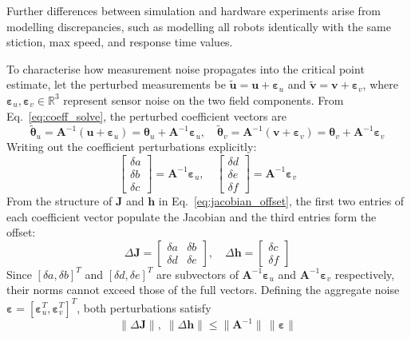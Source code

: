 \documentclass[lettersize,journal]{IEEEtran}
\begin{document}
Further differences between simulation and hardware experiments arise from modelling discrepancies, such as modelling all robots identically with the same stiction, max speed, and response time values. 

To characterise how measurement noise propagates into the critical point estimate, let the perturbed measurements be $\tilde{\mathbf{u}} = \mathbf{u} + \boldsymbol{\varepsilon}_u$ and $\tilde{\mathbf{v}} = \mathbf{v} + \boldsymbol{\varepsilon}_v$, where $\boldsymbol{\varepsilon}_u, \boldsymbol{\varepsilon}_v \in \mathbb{R}^3$ represent sensor noise on the two field components. From Eq.~\eqref{eq:coeff_solve}, the perturbed coefficient vectors are
\begin{equation}
    \tilde{\boldsymbol{\theta}}_u = \mathbf{A}^{-1}(\mathbf{u} + \boldsymbol{\varepsilon}_u) = \boldsymbol{\theta}_u + \mathbf{A}^{-1}\boldsymbol{\varepsilon}_u, \quad \tilde{\boldsymbol{\theta}}_v = \mathbf{A}^{-1}(\mathbf{v} + \boldsymbol{\varepsilon}_v) = \boldsymbol{\theta}_v + \mathbf{A}^{-1}\boldsymbol{\varepsilon}_v
    \label{eq:perturbed_coeffs}
\end{equation}
Writing out the coefficient perturbations explicitly:
\begin{equation}
    \begin{bmatrix} \delta a \\ \delta b \\ \delta c \end{bmatrix} = \mathbf{A}^{-1}\boldsymbol{\varepsilon}_u, \quad
    \begin{bmatrix} \delta d \\ \delta e \\ \delta f \end{bmatrix} = \mathbf{A}^{-1}\boldsymbol{\varepsilon}_v
    \label{eq:coeff_perturbations}
\end{equation}
From the structure of $\mathbf{J}$ and $\mathbf{h}$ in Eq.~\eqref{eq:jacobian_offset}, the first two entries of each coefficient vector populate the Jacobian and the third entries form the offset:
\begin{equation}
    \Delta\mathbf{J} = \begin{bmatrix} \delta a & \delta b \\ \delta d & \delta e \end{bmatrix}, \quad
    \Delta\mathbf{h} = \begin{bmatrix} \delta c \\ \delta f \end{bmatrix}
    \label{eq:J_h_perturbations}
\end{equation}
Since $[\delta a, \delta b]^T$ and $[\delta d, \delta e]^T$ are subvectors of $\mathbf{A}^{-1}\boldsymbol{\varepsilon}_u$ and $\mathbf{A}^{-1}\boldsymbol{\varepsilon}_v$ respectively, their norms cannot exceed those of the full vectors. Defining the aggregate noise $\boldsymbol{\varepsilon} = [\boldsymbol{\varepsilon}_u^T, \boldsymbol{\varepsilon}_v^T]^T$, both perturbations satisfy
\begin{equation}
    \|\Delta\mathbf{J}\|, \; \|\Delta\mathbf{h}\| \leq \|\mathbf{A}^{-1}\|\,\|\boldsymbol{\varepsilon}\|
    \label{eq:perturbation_bounds}
\end{equation}
\end{document}
